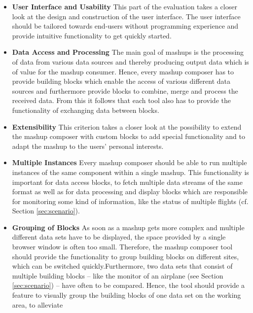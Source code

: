 \begin{itemize}
	\item \textbf{User Interface and Usability}\newline
	This part of the evaluation takes a closer look at the design and construction of the user
	interface. The user interface should be tailored towards end-users without programming experience
	and provide intuitive functionality to get quickly started.
	\item \textbf{Data Access and Processing}\newline
	The main goal of mashups is the processing of data from various data sources and thereby
	producing output data which is of value for the mashup consumer. Hence, every mashup
	composer has to provide building blocks which enable the access of various different data sources
	and furthermore provide blocks to combine, merge and process the received data. From this it
	follows that each tool also has to provide the functionality of exchanging data between
	blocks.
	\item \textbf{Extensibility}\newline
	This criterion takes a closer look at the possibility to extend the mashup composer with custom
	blocks to add special functionality and to adapt the mashup to the users' personal interests.
	\item \textbf{Multiple Instances}\newline
	Every mashup composer should be able to run multiple instances of the same component within a
	single mashup. This functionality is important for data access blocks, to fetch multiple
	data streams of the same format as well as for data processing and display blocks which are
	responsible for monitoring some kind of information, like the status of multiple flights (cf.
	Section \ref{sec:scenario}).
	\item \textbf{Grouping of Blocks}\newline
	As soon as a mashup gets more complex and multiple different data sets have to be displayed, the
	space provided by a single browser window is often too small. Therefore, the mashup composer tool
	should provide the functionality to group building blocks on different sites, which can be
	switched quickly.\newline Furthermore, two data sets that consist of multiple building blocks --
	like the monitor of an airplane (see Section \ref{sec:scenario}) -- have often to be compared.
	Hence, the tool should provide a feature to visually group the building blocks of one data set on the working area, to alleviate

\end{itemize}
